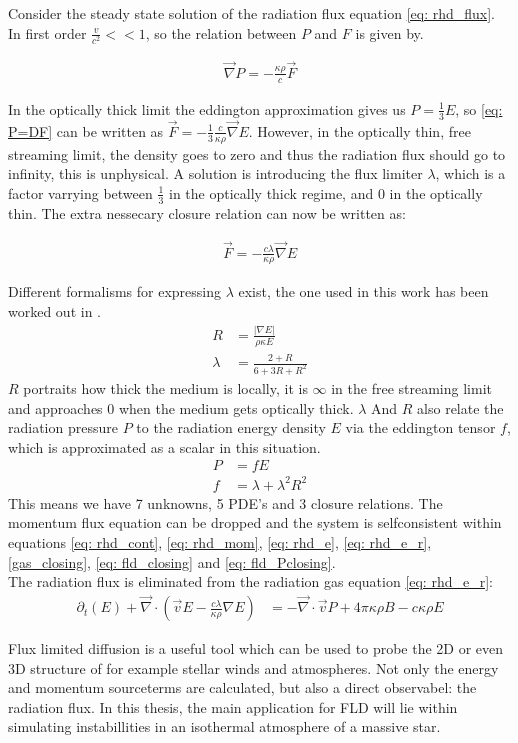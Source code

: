 Consider the steady state solution of the radiation flux equation \eqref{eq: rhd_flux}. In first order $\frac{v}{c^2} << 1$, so the relation between $P$ and $F$ is given by.

\begin{align}
\vec{\nabla} P = - \frac{\kappa \rho}{c} \vec{F} \label{eq: P=DF}
\end{align}

In the optically thick limit the eddington approximation gives us $P = \frac{1}{3}E$, so \eqref{eq: P=DF} can be written as $\vec{F} = -\frac{1}{3}\frac{c}{\kappa \rho} \vec{\nabla}E$. However, in the optically thin, free streaming limit, the density goes to zero and thus the radiation flux should go to infinity, this is unphysical. A solution is introducing the flux limiter $\lambda$, which is a factor varrying between $\frac{1}{3}$ in the optically thick regime, and $0$ in the optically thin. The extra nessecary closure relation can now be written as:

\begin{align}
\vec{F} = -\frac{c\lambda}{\kappa \rho} \vec{\nabla}E \label{eq: fld_closing}
\end{align}

Different formalisms for expressing $\lambda$ exist, the one used in this work has been worked out in \cite{Levermore1981}. 
\begin{align}
R &= \frac{|\nabla E|}{\rho \kappa E} \\
\lambda &= \frac{2 + R}{6 + 3R + R^2} 
\end{align}
$R$ portraits how thick the medium is locally, it is $\infty$ in the free streaming limit and approaches $0$ when the medium gets optically thick. $\lambda$ And $R$ also relate the radiation pressure $P$ to the radiation energy density $E$ via the eddington tensor $f$, which is approximated as a scalar in this situation.
\begin{align}
P &= f E  \label{eq: fld_Pclosing} \\
f &= \lambda + \lambda^2 R^2
\end{align}
This means we have 7 unknowns, 5 PDE's and 3 closure relations. The momentum flux equation can be dropped and the system is selfconsistent within equations \eqref{eq: rhd_cont}, \eqref{eq: rhd_mom}, \eqref{eq: rhd_e}, \eqref{eq: rhd_e_r}, \eqref{gas_closing}, \eqref{eq: fld_closing} and \eqref{eq: fld_Pclosing}. \\
The radiation flux is eliminated from the radiation gas equation \ref{eq: rhd_e_r}:
\begin{align}
 \partial_t \left(E \right) +  \vec{\nabla} \cdot \left( \vec{v} E -\frac{c \lambda}{\kappa \rho} \nabla E \right) &=  -\vec{\nabla} \cdot \vec{v} P + 4\pi \kappa\rho B - c \kappa \rho E
\end{align}

Flux limited diffusion is a useful tool which can be used to probe the 2D or even 3D structure of for example stellar winds and atmospheres. Not only the energy and momentum sourceterms are calculated, but also a direct observabel: the radiation flux. In this thesis, the main application for FLD will lie within simulating instabillities in an isothermal atmosphere of a massive star.